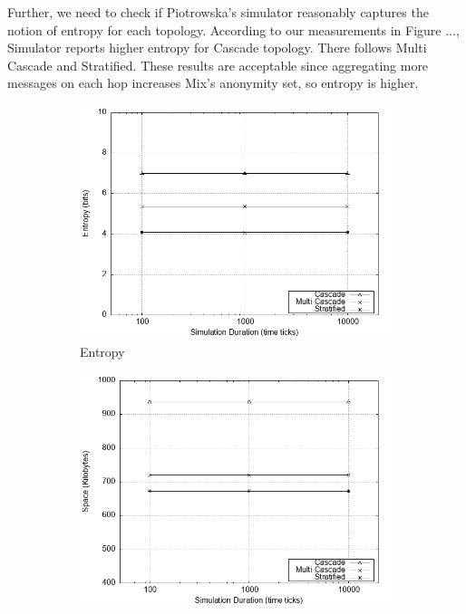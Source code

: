 \documentclass[logo,msc,cyber]{infthesis}   %
\begin{document}
Further, we need to check if Piotrowska's simulator reasonably captures the
notion of entropy for each topology. According to our measurements in Figure
..., Simulator reports higher entropy for Cascade topology. There follows Multi
Cascade and Stratified. These results are acceptable since aggregating more
messages on each hop increases Mix's anonymity set, so entropy is higher.

\begin{figure}[h!]
    \centering
    \begin{subfigure}[b]{0.45\textwidth}
        \centering
        \includegraphics[width=\textwidth]{figures/baseline_simulation/simulator/baseline_simulator_entropy.png}
        \caption{Entropy}
        \label{fig:baseline-entropy}
    \end{subfigure}
    \hfill
    \begin{subfigure}[b]{0.45\textwidth}
        \centering
        \includegraphics[width=\textwidth]{figures/baseline_simulation/simulator/baseline_simulator_space.png}

\end{subfigure}
\end{figure}
\end{document}
